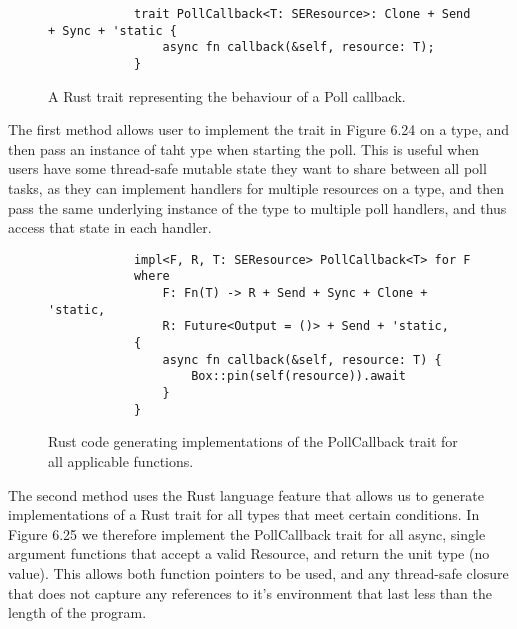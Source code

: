 \begin{figure}[h]
    \begin{center}
        \begin{lstlisting}
            trait PollCallback<T: SEResource>: Clone + Send + Sync + 'static {
                async fn callback(&self, resource: T);
            }
        \end{lstlisting}
        \label{fig:polltrait}
        \vspace{-10pt}
        \caption{A Rust trait representing the behaviour of a Poll callback.}
    \end{center}
\end{figure}

The first method allows user to implement the trait in Figure 6.24 on a type, and then pass an instance of taht ype when starting the poll.
This is useful when users have some thread-safe mutable state they want to share between all poll tasks, as they can implement handlers for multiple resources on a type, and then pass the same underlying instance of the type to multiple poll handlers, and thus access that state in each handler.


\begin{figure}[h]
    \begin{center}
        \begin{lstlisting}
            impl<F, R, T: SEResource> PollCallback<T> for F
            where
                F: Fn(T) -> R + Send + Sync + Clone + 'static,
                R: Future<Output = ()> + Send + 'static,
            {
                async fn callback(&self, resource: T) {
                    Box::pin(self(resource)).await
                }
            }            
        \end{lstlisting}
        \label{fig:pollimplgen}
        \vspace{-10pt}
        \caption{Rust code generating implementations of the PollCallback trait for all applicable functions.}
    \end{center}
\end{figure}

The second method uses the Rust language feature that allows us to generate implementations of a Rust trait for all types that meet certain conditions. In Figure 6.25 we therefore implement the PollCallback trait for all async, single argument functions that accept a valid Resource, and return the unit type (no value).
This allows both function pointers to be used, and any thread-safe closure that does not capture any references to it's environment that last less than the length of the program.


